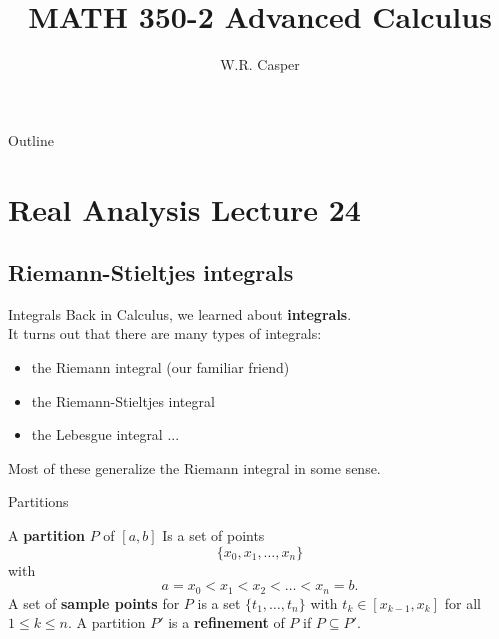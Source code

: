 \documentclass{beamer}
\title{MATH 350-2 Advanced Calculus}
\subtitle
{} %
\author[W.R. Casper] %
{W.R. Casper}
\institute[California State University Fullerton] %
{
  Department of Mathematics\\
  California State University Fullerton}
\begin{document}
\begin{frame}
  \titlepage
\end{frame}

\begin{frame}{Outline}
  \tableofcontents
\end{frame}



\section{Real Analysis Lecture 24}

\subsection{Riemann-Stieltjes integrals}

\begin{frame}{Integrals}
Back in Calculus, we learned about \textbf{integrals}.\\
\pause
It turns out that there are many types of integrals:
\begin{itemize}
\pause
\item the Riemann integral (our familiar friend)
\pause
\item the Riemann-Stieltjes integral
\pause
\item the Lebesgue integral ...
\end{itemize}
\pause
Most of these generalize the Riemann integral in some sense.
\end{frame}

\begin{frame}{Partitions}
\begin{defn}
A \textbf{partition} $P$ of $[a,b]$ Is a set of points
$$\{x_0,x_1,\dots,x_n\}$$
with
$$a=x_0 < x_1 < x_2 < \dots < x_n =b.$$
\pause
A set of \textbf{sample points} for $P$ is a set $\{t_1,\dots, t_n\}$ with $t_k\in [x_{k-1},x_k]$ for all $1\leq k\leq n$.
\pause
A partition $P'$ is a \textbf{refinement} of $P$ if $P\subseteq P'$.
\end{defn}
\end{frame}
\end{document}
